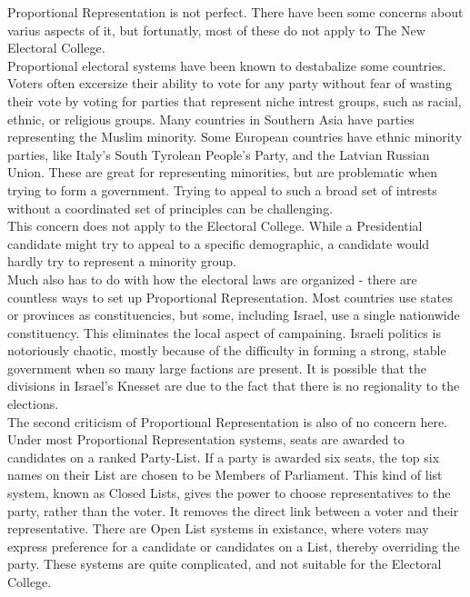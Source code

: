 \documentclass{article}
\begin{document}
    Proportional Representation is not perfect. There have been some concerns about varius aspects of it, but fortunatly, most of these do not apply to The New Electoral College.\\

    Proportional electoral systems have been known to destabalize some countries. Voters often excersize their ability to vote for any party without fear of wasting their vote by voting for parties that represent niche intrest groups, such as racial, ethnic, or religious groups. Many countries in Southern Asia have parties representing the Muslim minority. Some European countries have ethnic minority parties, like Italy's South Tyrolean People's Party, and the Latvian Russian Union. These are great for representing minorities, but are problematic when trying to form a government. Trying to appeal to such a broad set of intrests without a coordinated set of principles can be challenging.\\

    This concern does not apply to the Electoral College. While a Presidential candidate might try to appeal to a specific demographic, a candidate would hardly try to represent a minority group.\\

    Much also has to do with how the electoral laws are organized - there are countless ways to set up Proportional Representation. Most countries use states or provinces as constituencies, but some, including Israel, use a single nationwide constituency. This eliminates the local aspect of campaining. Israeli politics is notoriously chaotic, mostly because of the difficulty in forming a strong, stable government when so many large factions are present. It is possible that the divisions in Israel's Knesset are due to the fact that there is no regionality to the elections.\\

    The second criticism of Proportional Representation is also of no concern here. Under most Proportional Representation systems, seats are awarded to candidates on a ranked Party-List. If a party is awarded six seats, the top six names on their List are chosen to be Members of Parliament. This kind of list system, known as Closed Lists, gives the power to choose representatives to the party, rather than the voter. It removes the direct link between a voter and their representative. There are Open List systems in existance, where voters may express preference for a candidate or candidates on a List, thereby overriding the party. These systems are quite complicated, and not suitable for the Electoral College.\\
\end{document}
